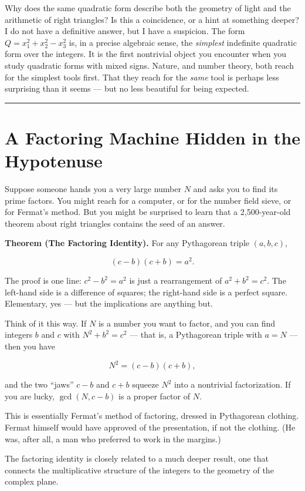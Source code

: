 Why does the same quadratic form describe both the geometry of light and the arithmetic of right triangles? Is this a coincidence, or a hint at something deeper? I do not have a definitive answer, but I have a suspicion. The form \(Q = x_1^2 + x_2^2 - x_3^2\) is, in a precise algebraic sense, the \emph{simplest} indefinite quadratic form over the integers. It is the first nontrivial object you encounter when you study quadratic forms with mixed signs. Nature, and number theory, both reach for the simplest tools first. That they reach for the \emph{same} tool is perhaps less surprising than it seems --- but no less beautiful for being expected.

\bigskip\noindent\rule{\linewidth}{0.4pt}\bigskip

\section{A Factoring Machine Hidden in the Hypotenuse}
Suppose someone hands you a very large number \(N\) and asks you to find its prime factors. You might reach for a computer, or for the number field sieve, or for Fermat's method. But you might be surprised to learn that a 2,500-year-old theorem about right triangles contains the seed of an answer.

\textbf{Theorem (The Factoring Identity).} For any Pythagorean triple \((a, b, c)\),

\[(c - b)(c + b) = a^2.\]

The proof is one line: \(c^2 - b^2 = a^2\) is just a rearrangement of \(a^2 + b^2 = c^2\). The left-hand side is a difference of squares; the right-hand side is a perfect square. Elementary, yes --- but the implications are anything but.

Think of it this way. If \(N\) is a number you want to factor, and you can find integers \(b\) and \(c\) with \(N^2 + b^2 = c^2\) --- that is, a Pythagorean triple with \(a = N\) --- then you have

\[N^2 = (c - b)(c + b),\]

and the two ``jaws'' \(c - b\) and \(c + b\) squeeze \(N^2\) into a nontrivial factorization. If you are lucky, \(\gcd(N, c - b)\) is a proper factor of \(N\).

This is essentially Fermat's method of factoring, dressed in Pythagorean clothing. Fermat himself would have approved of the presentation, if not the clothing. (He was, after all, a man who preferred to work in the margins.)

The factoring identity is closely related to a much deeper result, one that connects the multiplicative structure of the integers to the geometry of the complex plane.

